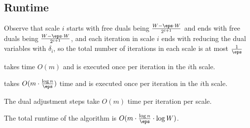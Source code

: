 \begin{lemma2}

\end{lemma2}

\subsection{Runtime}

\begin{observation2}
Observe that scale $i$ starts with free duals being $\frac{W-\eps\cdot W}{2^{i+1}}$ and ends with free duals being $\frac{W-\eps\cdot W}{2^{i+1}}$, and each iteration in scale $i$ ends with reducing the dual variables with $\delta_i$, so the total number of iterations in each scale is at most $\frac{1}{\eps}$
\end{observation2}

\begin{observation2}
 takes time $O(m)$ and is executed once per iteration in the $i$th scale. 
\end{observation2}

\begin{observation2}
 takes $O(m\cdot \frac{\log n}{\eps})$ time and is executed once per iteration in the $i$th scale.
\end{observation2}

\begin{observation2}
The dual adjustment steps take $O(m)$ time per iteration per scale. 
\end{observation2}

\begin{claim2}
The total runtime of the algorithm is $O(m\cdot \frac{\log n}{\eps}\cdot \log W)$. 
\end{claim2}